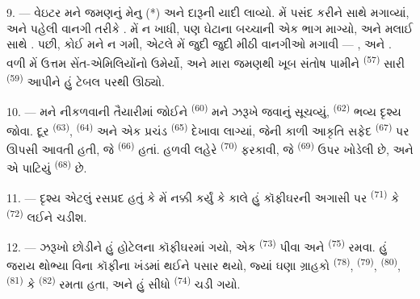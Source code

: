 
\VUsaut{4.0mm}
\VUsaut{3.0mm}

9. --- વેઇટર મને જમણનું મેનુ (*) અને દારૂની યાદી
લાવ્યો. મેં પસંદ કરીને 
 સાથે મગાવ્યાં, અને પહેલી વાનગી તરીકે . મેં  ન ખાધી, પણ ઘેટાના બચ્ચાની
 એક ભાગ માગ્યો, અને  મલાઈ સાથે
. પછી,  કોઈ મને ન ગમી, એટલે મેં
જુદી જુદી મીઠી વાનગીઓ મગાવી — ,  અને
. વળી મેં ઉત્તમ સેંત-એમિલિયોંનો 
ઉમેર્યો, અને મારા જમણથી ખૂબ સંતોષ પામીને 
\textsuperscript{(57)} સારી  \textsuperscript{(59)}
આપીને હું ટેબલ પરથી ઊઠ્યો.

10. --- મને નીકળવાની તૈયારીમાં જોઈને 
\textsuperscript{(60)} મને ઝરૂખે જવાનું સૂચવ્યું, 
\textsuperscript{(62)} ભવ્ય દૃશ્ય જોવા. દૂર  \textsuperscript{(63)}, 
\textsuperscript{(64)} અને એક પ્રચંડ 
\textsuperscript{(65)} દેખાવા લાગ્યાં, જેની કાળી આકૃતિ સફેદ
 \textsuperscript{(67)} પર ઊપસી આવતી હતી, જે
 \textsuperscript{(66)} હતાં. હળવી લહેરે
 \textsuperscript{(70)} ફરકાવી, જે 
\textsuperscript{(69)} ઉપર ખોડેલી છે, અને એ પાટિયું 
\textsuperscript{(68)} છે.

\VUsaut{3.0mm}
\VUsaut{3.0mm}

11. --- દૃશ્ય એટલું રસપ્રદ હતું કે મેં નક્કી કર્યું કે કાલે હું
કૉફીઘરની અગાસી પર  \textsuperscript{(71)} કે
 \textsuperscript{(72)} લઈને ચડીશ.

12. --- ઝરૂખો છોડીને હું હોટેલના કૉફીઘરમાં ગયો, એક 
\textsuperscript{(73)} પીવા અને 
\textsuperscript{(75)} રમવા. હું જરાય થોભ્યા વિના કૉફીના ખંડમાં થઈને
પસાર થયો, જ્યાં ઘણા ગ્રાહકો  \textsuperscript{(78)},
 \textsuperscript{(79)}, 
\textsuperscript{(80)},  \textsuperscript{(81)} કે
 \textsuperscript{(82)} રમતા હતા, અને હું સીધો
 \textsuperscript{(74)} ચડી ગયો.

